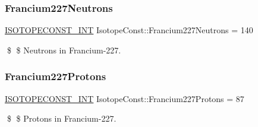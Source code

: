 \subsubsection{\texorpdfstring{Francium227\+Neutrons}{Francium227Neutrons}}
{\footnotesize\ttfamily \mbox{\hyperlink{group___isotope_const-_macros_ga5f18360b3e99483a35c32d789e62621c}{I\+S\+O\+T\+O\+P\+E\+C\+O\+N\+S\+T\+\_\+\+I\+NT}} Isotope\+Const\+::\+Francium227\+Neutrons = 140}

\$ \$ Neutrons in Francium-\/227. \mbox{\label{group___isotope_const-_francium-_fr227_ga25b5049f55630ae3d2afa50f2b9f6ace}} 
\subsubsection{\texorpdfstring{Francium227\+Protons}{Francium227Protons}}
{\footnotesize\ttfamily \mbox{\hyperlink{group___isotope_const-_macros_ga5f18360b3e99483a35c32d789e62621c}{I\+S\+O\+T\+O\+P\+E\+C\+O\+N\+S\+T\+\_\+\+I\+NT}} Isotope\+Const\+::\+Francium227\+Protons = 87}

\$ \$ Protons in Francium-\/227. 
